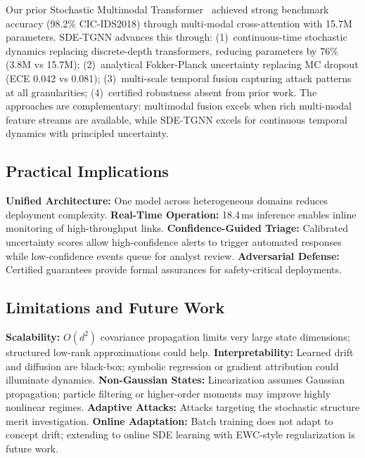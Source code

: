 \documentclass[10pt,journal,compsoc]{IEEEtran}
\begin{document}
Our prior Stochastic Multimodal Transformer~\cite{anaedevha2026stochastic} achieved strong benchmark accuracy (98.2\% CIC-IDS2018) through multi-modal cross-attention with 15.7M parameters. SDE-TGNN advances this through: (1)~continuous-time stochastic dynamics replacing discrete-depth transformers, reducing parameters by 76\% (3.8M vs 15.7M); (2)~analytical Fokker-Planck uncertainty replacing MC dropout (ECE 0.042 vs 0.081); (3)~multi-scale temporal fusion capturing attack patterns at all granularities; (4)~certified robustness absent from prior work. The approaches are complementary: multimodal fusion excels when rich multi-modal feature streams are available, while SDE-TGNN excels for continuous temporal dynamics with principled uncertainty.

\vspace{-0.2cm}
\subsection{Practical Implications}

\textbf{Unified Architecture:} One model across heterogeneous domains reduces deployment complexity. \textbf{Real-Time Operation:} 18.4\,ms inference enables inline monitoring of high-throughput links. \textbf{Confidence-Guided Triage:} Calibrated uncertainty scores allow high-confidence alerts to trigger automated responses while low-confidence events queue for analyst review. \textbf{Adversarial Defense:} Certified guarantees provide formal assurances for safety-critical deployments.

\vspace{-0.2cm}
\subsection{Limitations and Future Work}

\textbf{Scalability:} $O(d^2)$ covariance propagation limits very large state dimensions; structured low-rank approximations could help. \textbf{Interpretability:} Learned drift and diffusion are black-box; symbolic regression or gradient attribution could illuminate dynamics. \textbf{Non-Gaussian States:} Linearization assumes Gaussian propagation; particle filtering or higher-order moments may improve highly nonlinear regimes. \textbf{Adaptive Attacks:} Attacks targeting the stochastic structure merit investigation. \textbf{Online Adaptation:} Batch training does not adapt to concept drift; extending to online SDE learning with EWC-style regularization is future work.
\end{document}
